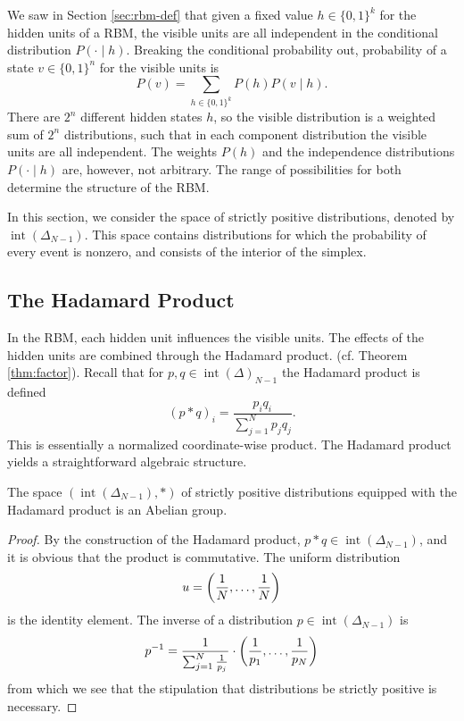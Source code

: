 \documentclass[11pt,titlepage]{article}
\DeclareMathOperator{\intr}{int}
\numberwithin{equation}{section}
\begin{document}
    We saw in Section \ref{sec:rbm-def} that given a fixed value $h \in
    \{0,1\}^k$ for the hidden units of a RBM, the visible units are all
    independent in the conditional distribution $P( \cdot\mid h )$.  Breaking
    the conditional probability out, probability of a state $v \in \{0,1\}^n$
    for the visible units is
    \[
        P( v ) = \sum_{h \in \{0,1\}^k} P( h ) P( v \mid h ).
    \]
    There are $2^n$ different hidden states $h$, so the visible distribution is
    a weighted sum of $2^n$ distributions, such that in each component
    distribution the visible units are all independent.  The weights $P(h)$ and
    the independence distributions $P(\cdot \mid h)$ are, however, not
    arbitrary.  The range of possibilities for both determine the structure of
    the RBM.

    In this section, we consider the space of strictly positive distributions,
    denoted by $\intr(\Delta_{N-1})$.  This space contains distributions for
    which the probability of every event is nonzero, and consists of the
    interior of the simplex.

\subsection{The Hadamard Product}

    In the RBM, each hidden unit influences the visible units.  The effects of
    the hidden units are combined through the Hadamard product.  (cf. Theorem
    \ref{thm:factor}).  Recall that for $p, q \in \intr(\Delta)_{N-1}$ the
    Hadamard product is defined
    \[
        (p * q)_i = \frac{p_i q_i}{\sum_{j=1}^N p_j q_j}.
    \]
    This is essentially a normalized coordinate-wise product.  The Hadamard
    product yields a straightforward algebraic structure.

    \begin{theorem}
    The space $(\intr(\Delta_{N-1}), *)$ of strictly positive distributions
    equipped with the Hadamard product is an Abelian group.
    \end{theorem}
    \begin{proof}
    By the construction of the Hadamard product, $p * q \in
    \intr(\Delta_{N-1})$, and it is obvious that the product is commutative.
    The uniform distribution
    \[
        u = \pdil*{\frac 1 N, \ldots, \frac 1 N}
    \]
    is the identity element.  The inverse of a distribution $p \in
    \intr(\Delta_{N-1})$ is 
    \[
        \inv p = \frac{1}{\sum_{j=1}^N \frac 1 {p_j}}
        \cdot\pdil*{\frac 1 {p_1}, \ldots, \frac 1 {p_N}}
    \]
    from which we see that the stipulation that distributions be strictly
    positive is necessary.
    \end{proof}
\end{document}
